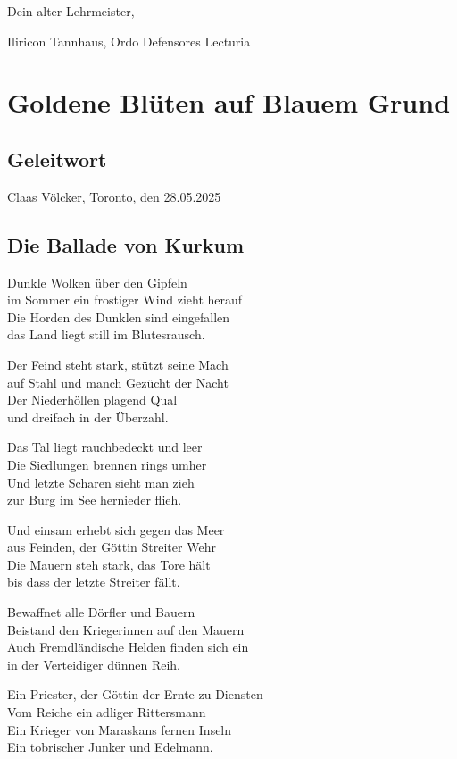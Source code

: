Dein alter Lehrmeister,

Iliricon Tannhaus, Ordo Defensores Lecturia
\chapter{Goldene Blüten auf Blauem Grund}

\section{Geleitwort}


\begin{flushright}
Claas Völcker, Toronto, den 28.05.2025
\end{flushright}

\section{Die Ballade von Kurkum}

Dunkle Wolken über den Gipfeln\\
im Sommer ein frostiger Wind zieht herauf\\
Die Horden des Dunklen sind eingefallen\\
das Land liegt still im Blutesrausch.

Der Feind steht stark, stützt seine Mach\\
auf Stahl und manch Gezücht der Nacht\\
Der Niederhöllen plagend Qual\\
und dreifach in der Überzahl.

Das Tal liegt rauchbedeckt und leer\\
Die Siedlungen brennen rings umher\\
Und letzte Scharen sieht man zieh\\
zur Burg im See hernieder flieh.

Und einsam erhebt sich gegen das Meer\\
aus Feinden, der Göttin Streiter Wehr\\
Die Mauern steh stark, das Tore hält\\
bis dass der letzte Streiter fällt.

Bewaffnet alle Dörfler und Bauern\\
Beistand den Kriegerinnen auf den Mauern\\
Auch Fremdländische Helden finden sich ein\\
in der Verteidiger dünnen Reih.

Ein Priester, der Göttin der Ernte zu Diensten\\
Vom Reiche ein adliger Rittersmann\\
Ein Krieger von Maraskans fernen Inseln\\
Ein tobrischer Junker und Edelmann.

